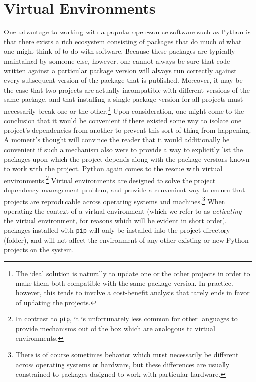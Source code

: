 \documentclass[12pt]{article}
\begin{document}
\section{Virtual Environments\label{sec:virtual-environments}}
One advantage to working with a popular open-source software such as Python is that there exists a rich ecosystem
consisting of packages that do much of what one might think of to do with software. Because these packages are typically
maintained by someone else, however, one cannot always be sure that code written against a particular package version
will always run correctly against every subsequent version of the package that is published. Moreover, it may be the
case that two projects are actually incompatible with different versions of the same package, and that installing a
single package version for all projects must necessarily break one or the other.\footnote{
    The ideal solution is naturally to update one or the other projects in order to make them both compatible with the 
    same package version. In practice, however, this tends to involve a cost-benefit analysis that rarely ends in favor 
    of updating the projects.
} Upon consideration, one might come to the conclusion that it would be convenient if there existed some way to isolate
one project's dependencies from another to prevent this sort of thing from happening. A moment's thought will convince 
the reader that it would additionally be convenient if such a mechanism also were to provide a way to explicitly list 
the packages upon which the project depends along with the package versions known to work with the project. Python again 
comes to the rescue with virtual environments.\footnote{
    In contrast to \texttt{pip}, it is unfortunately less common for other languages to provide mechanisms out of the box
    which are analogous to virtual environments.
}
Virtual environments are designed to solve the project dependency management problem, and provide a convenient way to
ensure that projects are reproducable across operating systems and machines.\footnote{
    There is of course sometimes behavior which must necessarily be different across operating systems or hardware, but
    these differences are usually constrained to packages designed to work with particular hardware.
} When operating the context of a virtual environment (which we refer to as \emph{activating} the virtual environment, for 
reasons which will be evident in short order), packages installed with \texttt{pip} will only be installed into
the project directory (folder), and will not affect the environment of any other existing or new Python projects on the
system.
\end{document}
